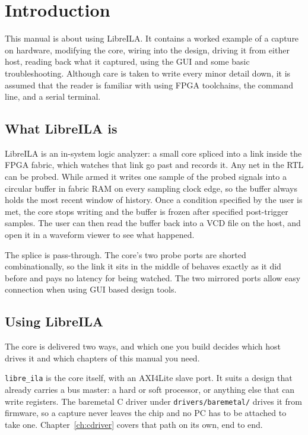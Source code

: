 \documentclass[../manual.tex]{subfiles}
\begin{document}
\chapter{Introduction}
\label{ch:intro}

This manual is about using LibreILA. It contains a worked example of a capture on hardware, modifying the core, wiring into the design, driving it from either host, reading back what it captured, using the GUI and some basic troubleshooting. Although care is taken to write every minor detail down, it is assumed that the reader is familiar with using FPGA toolchains, the command line, and a serial terminal. 


\section{What LibreILA is}
\label{sec:intro_what}

LibreILA is an in-system logic analyzer: a small core spliced into a link inside the FPGA fabric, which watches that link go past and records it. Any net in the RTL can be probed. While armed it writes one sample of the probed signals into a circular buffer in fabric RAM on every sampling clock edge, so the buffer always holds the most recent window of history. Once a condition specified by the user is met, the core stops writing and the buffer is frozen after specified post-trigger samples. The user can then read the buffer back into a VCD file on the host, and open it in a waveform viewer to see what happened.

The splice is pass-through. The core's two probe ports are shorted combinationally, so the link it sits in the middle of behaves exactly as it did before and pays no latency for being watched. The two mirrored ports allow easy connection when using GUI based design tools.

\section{Using LibreILA}
\label{sec:intro_deliverables}

The core is delivered two ways, and which one you build decides which host drives it and which chapters of this manual you need.

\texttt{libre\_ila} is the core itself, with an AXI4Lite slave port. It suits a design that already carries a bus master: a hard or soft processor, or anything else that can write registers. The baremetal C driver under \texttt{drivers/baremetal/} drives it from firmware, so a capture never leaves the chip and no PC has to be attached to take one. Chapter~\ref{ch:cdriver} covers that path on its own, end to end.
\end{document}
